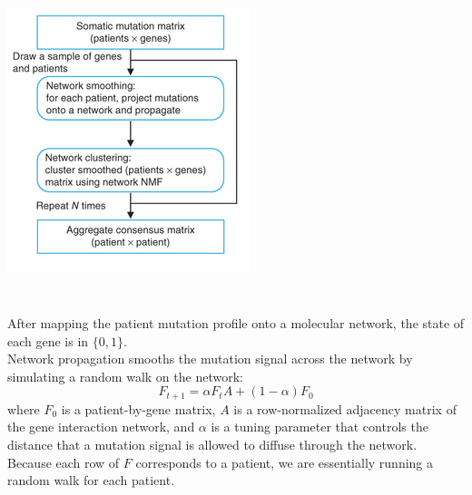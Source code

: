 \begin{frame}[fragile] \frametitle{}
    \begin{center}
        \includegraphics[scale=0.65]{img/overview.png}
    \end{center}

\end{frame}
\begin{frame}[fragile] \frametitle{}
     \\
    \vspace{0.5cm}
    After mapping the patient mutation profile onto a molecular network, the
    state of each gene is in $\{0, 1\}$.    \\
    \vspace{0.2cm}
    Network propagation smooths the mutation signal across the network by
    simulating a random walk on the network:
    $$
    F_{t+1} = \alpha F_t A + (1 - \alpha) F_0
    $$
    where $F_0$ is a patient-by-gene matrix, $A$ is a row-normalized
    adjacency matrix of the gene interaction network, and $\alpha$ is a
    tuning parameter that controls the distance that a mutation signal is
    allowed to diffuse through the network. \\
    \vspace{0.2cm}
    Because each row of $F$ corresponds to a patient, we are essentially
    running a random walk for each patient.
\end{frame}
